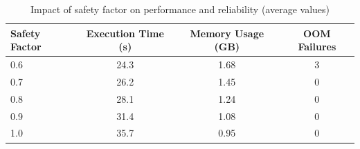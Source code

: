 \begin{table}[htb]
    \centering
    \caption{Impact of safety factor on performance and reliability (average values)}
    \label{tab:safety-factor}
    \begin{tabular}{lccc}
        \toprule
        \textbf{Safety Factor} & \textbf{Execution Time (s)} & \textbf{Memory Usage (\ac{GB})} & \textbf{\ac{OOM} Failures} \\
        \midrule
        0.6 & 24.3 & 1.68 & 3 \\
        0.7 & 26.2 & 1.45 & 0 \\
        0.8 & 28.1 & 1.24 & 0 \\
        0.9 & 31.4 & 1.08 & 0 \\
        1.0 & 35.7 & 0.95 & 0 \\
        \bottomrule
    \end{tabular}
\end{table}
